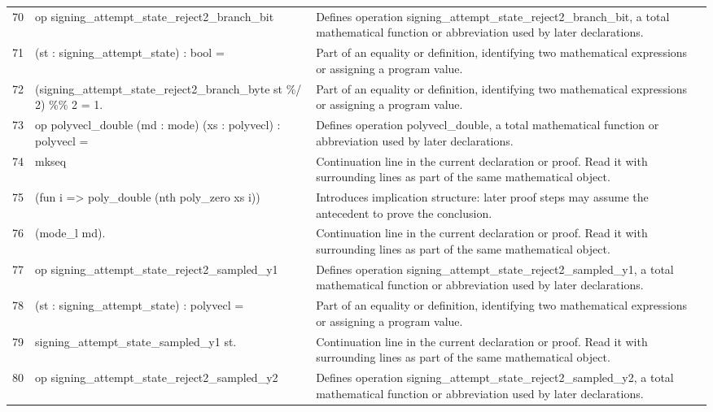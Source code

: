 \documentclass[10pt]{article}
\begin{document}
\begin{longtable}{r L{0.53\textwidth} L{0.37\textwidth}}
70 & {\ttfamily\scriptsize op signing\_attempt\_state\_reject2\_branch\_bit} & Defines operation signing\_attempt\_state\_reject2\_branch\_bit, a total mathematical function or abbreviation used by later declarations. \\
71 & {\ttfamily\scriptsize    (st : signing\_attempt\_state) : bool =} & Part of an equality or definition, identifying two mathematical expressions or assigning a program value. \\
72 & {\ttfamily\scriptsize   (signing\_attempt\_state\_reject2\_branch\_byte st \%/ 2) \%\% 2 = 1.} & Part of an equality or definition, identifying two mathematical expressions or assigning a program value. \\
73 & {\ttfamily\scriptsize op polyvecl\_double (md : mode) (xs : polyvecl) : polyvecl =} & Defines operation polyvecl\_double, a total mathematical function or abbreviation used by later declarations. \\
74 & {\ttfamily\scriptsize   mkseq} & Continuation line in the current declaration or proof.  Read it with surrounding lines as part of the same mathematical object. \\
75 & {\ttfamily\scriptsize     (fun i => poly\_double (nth poly\_zero xs i))} & Introduces implication structure: later proof steps may assume the antecedent to prove the conclusion. \\
76 & {\ttfamily\scriptsize     (mode\_l md).} & Continuation line in the current declaration or proof.  Read it with surrounding lines as part of the same mathematical object. \\
77 & {\ttfamily\scriptsize op signing\_attempt\_state\_reject2\_sampled\_y1} & Defines operation signing\_attempt\_state\_reject2\_sampled\_y1, a total mathematical function or abbreviation used by later declarations. \\
78 & {\ttfamily\scriptsize    (st : signing\_attempt\_state) : polyvecl =} & Part of an equality or definition, identifying two mathematical expressions or assigning a program value. \\
79 & {\ttfamily\scriptsize   signing\_attempt\_state\_sampled\_y1 st.} & Continuation line in the current declaration or proof.  Read it with surrounding lines as part of the same mathematical object. \\
80 & {\ttfamily\scriptsize op signing\_attempt\_state\_reject2\_sampled\_y2} & Defines operation signing\_attempt\_state\_reject2\_sampled\_y2, a total mathematical function or abbreviation used by later declarations. \\

\end{longtable}
\end{document}
